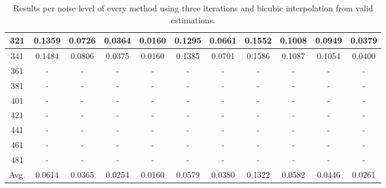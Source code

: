 \begin{table}[ht!]
\begin{tabular}{c|c|c|c|c|c|c|c|c|c|c}
321 & 0.1359 & 0.0726 & 0.0364 & 0.0160 & 0.1295 & 0.0661 & 0.1552 & 0.1008 & 0.0949 & 0.0379 \\ \hline
341 & 0.1484 & 0.0806 & 0.0375 & 0.0160 & 0.1385 & 0.0701 & 0.1586 & 0.1087 & 0.1054 & 0.0400 \\ \hline
361 & - & - & - & - & - & - & - & - & - & - \\ \hline
381 & - & - & - & - & - & - & - & - & - & - \\ \hline
401 & - & - & - & - & - & - & - & - & - & - \\ \hline
421 & - & - & - & - & - & - & - & - & - & - \\ \hline
441 & - & - & - & - & - & - & - & - & - & - \\ \hline
461 & - & - & - & - & - & - & - & - & - & - \\ \hline
481 & - & - & - & - & - & - & - & - & - & - \\ \hline
Avg.  & 0.0614 & 0.0365 & 0.0254 & 0.0160 & 0.0579 & 0.0380 & 0.1322 & 0.0582 & 0.0446 & 0.0261 \\ \hline
\end{tabular}
\caption{Results per noise level of every method using three  iterations and bicubic interpolation from valid estimations.}
\label{tab:3itCperNoiseValid}
\end{table}


